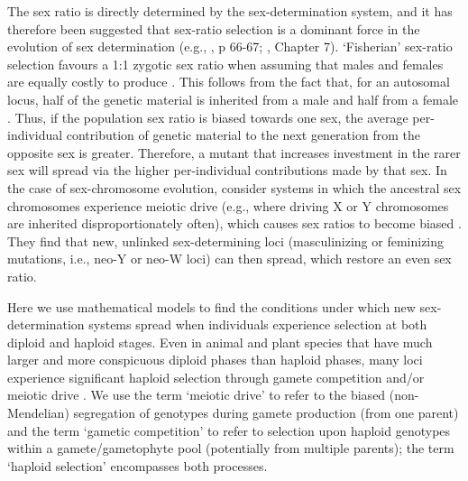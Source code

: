 \documentclass[12pt]{article}
\begin{document}
The sex ratio is directly determined by the sex-determination system, and it has therefore been suggested that sex-ratio selection is a dominant force in the evolution of sex determination (e.g., \citealt{Bull:1983vi}, p 66-67; \citealt{Beukeboom:2014vb}, Chapter 7). 
`Fisherian' sex-ratio selection favours a 1:1 zygotic sex ratio when assuming that males and females are equally costly to produce \citep{Fisher:1930wy,Charnov:1982wg}.
This follows from the fact that, for an autosomal locus, half of the genetic material is inherited from a male and half from a female \citep{West:2009we}. 
Thus, if the population sex ratio is biased towards one sex, the average per-individual contribution of genetic material to the next generation from the opposite sex is greater. 
Therefore, a mutant that increases investment in the rarer sex will spread via the higher per-individual contributions made by that sex. 
In the case of sex-chromosome evolution, \citet{Kozielska:2010vm} consider systems in which the ancestral sex chromosomes experience meiotic drive (e.g., where driving X or Y chromosomes are inherited disproportionately often), which causes sex ratios to become biased \citep{Hamilton:1967ts}. 
They find that new, unlinked sex-determining loci (masculinizing or feminizing mutations, i.e., neo-Y or neo-W loci) can then spread, which restore an even sex ratio. 

Here we use mathematical models to find the conditions under which new sex-determination systems spread when individuals experience selection at both diploid and haploid stages. 
Even in animal and plant species that have much larger and more conspicuous diploid phases than haploid phases, many loci experience significant haploid selection through gamete competition and/or meiotic drive \citep{Mulcahy:1996ha,JOSEPH:2004haa}.
We use the term `meiotic drive' to refer to the biased (non-Mendelian) segregation of genotypes during gamete production (from one parent) and the term `gametic competition' to refer to selection upon haploid genotypes within a gamete/gametophyte pool (potentially from multiple parents); the term `haploid selection' encompasses both processes. 
\end{document}
